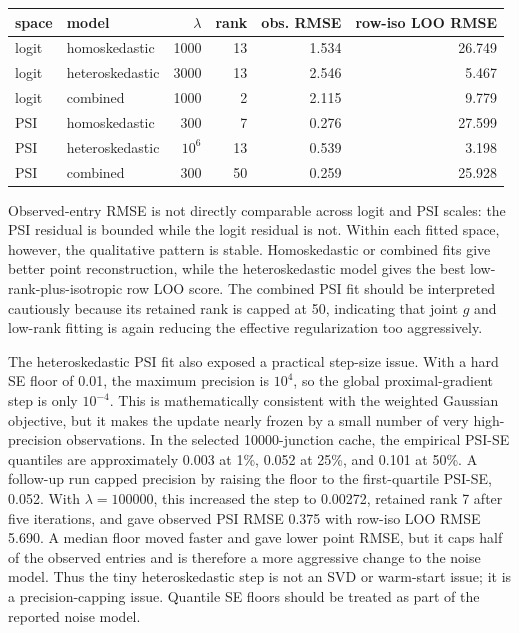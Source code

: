 \documentclass[11pt]{article}
\begin{document}
\begin{center}
\begin{tabular}{llrrrr}
\toprule
space & model & \(\lambda\) & rank & obs. RMSE & row-iso LOO RMSE\\
\midrule
logit & homoskedastic & 1000 & 13 & 1.534 & 26.749\\
logit & heteroskedastic & 3000 & 13 & 2.546 & 5.467\\
logit & combined & 1000 & 2 & 2.115 & 9.779\\
PSI & homoskedastic & 300 & 7 & 0.276 & 27.599\\
PSI & heteroskedastic & \(10^6\) & 13 & 0.539 & 3.198\\
PSI & combined & 300 & 50 & 0.259 & 25.928\\
\bottomrule
\end{tabular}
\end{center}

Observed-entry RMSE is not directly comparable across logit and PSI scales: the
PSI residual is bounded while the logit residual is not.  Within each fitted
space, however, the qualitative pattern is stable.  Homoskedastic or combined
fits give better point reconstruction, while the heteroskedastic model gives
the best low-rank-plus-isotropic row LOO score.  The combined PSI fit should be
interpreted cautiously because its retained rank is capped at 50, indicating
that joint \(g\) and low-rank fitting is again reducing the effective
regularization too aggressively.

The heteroskedastic PSI fit also exposed a practical step-size issue.  With a
hard SE floor of 0.01, the maximum precision is \(10^4\), so the global
proximal-gradient step is only \(10^{-4}\).  This is mathematically consistent
with the weighted Gaussian objective, but it makes the update nearly frozen by
a small number of very high-precision observations.  In the selected
10000-junction cache, the empirical PSI-SE quantiles are approximately 0.003
at 1\%, 0.052 at 25\%, and 0.101 at 50\%.  A follow-up run capped precision by
raising the floor to the first-quartile PSI-SE, 0.052.  With
\(\lambda=100000\), this increased the step to 0.00272, retained rank 7 after
five iterations, and gave observed PSI RMSE 0.375 with row-iso LOO RMSE 5.690.
A median floor moved faster and gave lower point RMSE, but it caps half of the
observed entries and is therefore a more aggressive change to the noise model.
Thus the tiny heteroskedastic step is not an SVD or warm-start issue; it is a
precision-capping issue.  Quantile SE floors should be treated as part of the
reported noise model.
\end{document}

